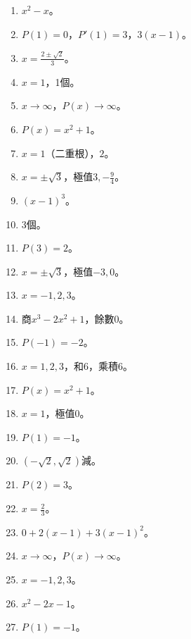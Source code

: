 \begin{enumerate}[label=\arabic*.]
    \item $x^2 - x$。
    \item $P(1) = 0$，$P'(1) = 3$，$3(x - 1)$。
    \item $x = \frac{2 \pm \sqrt{2}}{3}$。
    \item $x = 1$，1個。
    \item $x \to \infty$，$P(x) \to \infty$。
    \item $P(x) = x^2 + 1$。
    \item $x = 1$（二重根），$2$。
    \item $x = \pm \sqrt{3}$，極值$3, -\frac{9}{4}$。
    \item $(x - 1)^3$。
    \item 3個。
    \item $P(3) = 2$。
    \item $x = \pm \sqrt{3}$，極值$-3, 0$。
    \item $x = -1, 2, 3$。
    \item 商$x^3 - 2x^2 + 1$，餘數$0$。
    \item $P(-1) = -2$。
    \item $x = 1, 2, 3$，和$6$，乘積$6$。
    \item $P(x) = x^2 + 1$。
    \item $x = 1$，極值$0$。
    \item $P(1) = -1$。
    \item $(-\sqrt{2}, \sqrt{2})$減。
    \item $P(2) = 3$。
    \item $x = \frac{2}{3}$。
    \item $0 + 2(x - 1) + 3(x - 1)^2$。
    \item $x \to \infty$，$P(x) \to \infty$。
    \item $x = -1, 2, 3$。
    \item $x^2 - 2x - 1$。
    \item $P(1) = -1$。
\end{enumerate}


